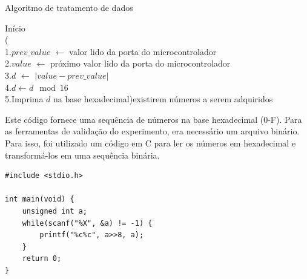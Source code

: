 \begin{algorithm}
\label{alg1}
    \caption{Algoritmo de tratamento de dados}
    Início\\
    \While(\\
       1.$prev\_value$ $\leftarrow$ valor lido da porta do microcontrolador\\
       2.$value$ $\leftarrow$ próximo valor lido da porta do microcontrolador\\
       3.$d$ $\leftarrow$ $|value - prev\_value|$\\
       4.$d \leftarrow d \mod 16$\\
       5.Imprima $d$ na base hexadecimal){existirem números a serem adquiridos}
       
\end{algorithm}

Este código fornece uma sequência de números na base hexadecimal (0-F). Para as ferramentas de validação do experimento, era necessário
um arquivo binário. Para isso, foi utilizado um código em C para ler os números em hexadecimal e transformá-los em uma sequência binária.

\begin{lstlisting}[caption={Conversão hexa-binário},captionpos=b]
#include <stdio.h>

int main(void) {
	unsigned int a;
	while(scanf("%X", &a) != -1) {
		printf("%c%c", a>>8, a);
	}
	return 0;
}

\end{lstlisting}
